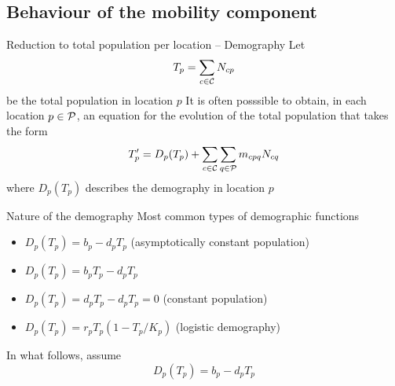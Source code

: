 \documentclass[aspectratio=169]{beamer}\usepackage[]{graphicx}\usepackage[]{xcolor}
\begin{document}
\subsection{Behaviour of the mobility component}




\begin{frame}{Reduction to total population per location -- Demography}
Let 
\[
	T_p = \sum_{c\in\C}N_{cp}
\]
be the total population in location $p$
\vfill
It is often posssible to obtain, in each location $p\in\P$, an equation for the evolution of the total population that takes the form
\begin{equation}\label{eq:dT_total_population}
	T_p' = 
	D_p(T_p)+\sum_{c\in\C}\sum_{q\in\P}m_{cpq}N_{cq}
\end{equation}
where $D_p(T_p)$ describes the demography in location $p$
\end{frame}

\begin{frame}{Nature of the demography}
	Most common types of demographic functions
	\begin{itemize}
		\item $D_p(T_p)=b_p-d_pT_p$ (asymptotically constant population)
		\item $D_p(T_p)=b_pT_p-d_pT_p$ 
		\item $D_p(T_p)=d_pT_p-d_pT_p=0$ (constant population)
		\item $D_p(T_p)=r_pT_p(1-T_p/K_p)$ (logistic demography)
	\end{itemize}
	\vfill
	In what follows, assume 
	\begin{equation}\label{eq:demography_function}
		D_p(T_p)=b_p-d_pT_p
	\end{equation}
\end{frame}
\end{document}
